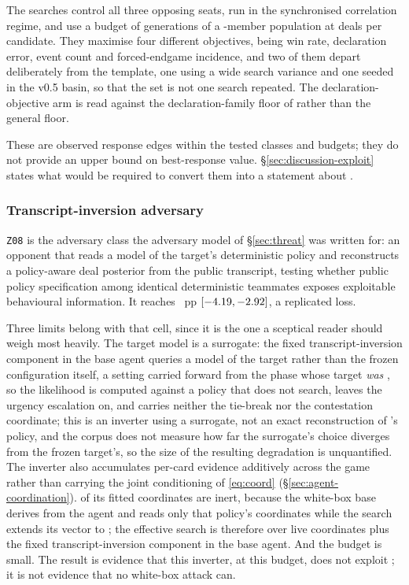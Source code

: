 The searches control all three opposing seats, run in the synchronised correlation regime, and use a
budget of \vsevenBfourGens{} generations of a \vsevenBfourPop{}-member population at
\vsevenBfourDeals{} deals per candidate. They maximise four different objectives, being win rate,
declaration error, event count and forced-endgame incidence, and two of them depart deliberately from
the template, one using a wide search variance and one seeded in the v0.5 basin, so that the set is
not one search repeated. The declaration-objective arm is read against the declaration-family floor of
\vsevenDeclFloor{} rather than the general floor.

These are observed response edges within the tested classes and budgets; they do not provide an
upper bound on best-response value. \S\ref{sec:discussion-exploit} states what would be required to
convert them into a statement about \sestina{}.

\subsubsection{Transcript-inversion adversary}
\label{sec:results-whitebox}

\texttt{Z08} is the adversary class the adversary model of \S\ref{sec:threat} was written for: an
opponent that reads a model of the target's deterministic policy and reconstructs a policy-aware
deal posterior from the public transcript, testing whether public policy specification among
identical deterministic teammates exposes exploitable behavioural information. It reaches
\vsevenZeightEdge{}~pp $[-4.19, -2.92]$, a replicated loss.

Three limits belong with that cell, since it is the one a sceptical reader should weigh most
heavily. The target model is a surrogate: the fixed transcript-inversion component in the base agent
queries a \vsix{} model of the target rather than the frozen configuration itself, a setting carried
forward from the phase whose target \emph{was} \vsix{}, so the likelihood is computed against a
policy that does not search, leaves the urgency escalation on, and carries neither the tie-break nor
the contestation coordinate; this is an inverter using a \vsix{} surrogate, not an exact
reconstruction of \sestina{}'s policy, and the corpus does not measure how far the surrogate's
choice diverges from the frozen target's, so the size of the resulting degradation is unquantified.
The inverter also accumulates per-card evidence additively across the game rather than carrying the
joint conditioning of \eqref{eq:coord} (\S\ref{sec:agent-coordination}). \vsevenZeightInert{} of its fitted coordinates are inert, because the white-box base derives from the
\vsix{} agent and reads only that policy's \vsevenVsixCoords{} coordinates while the search extends
its vector to \vsevenCoordinates{}; the effective search is therefore over \vsevenZeightLive{} live
coordinates plus the fixed transcript-inversion component in the base agent. And the budget is
small. The result is evidence that
this inverter, at this budget, does not exploit \sestina{}; it is not evidence that no white-box
attack can.

